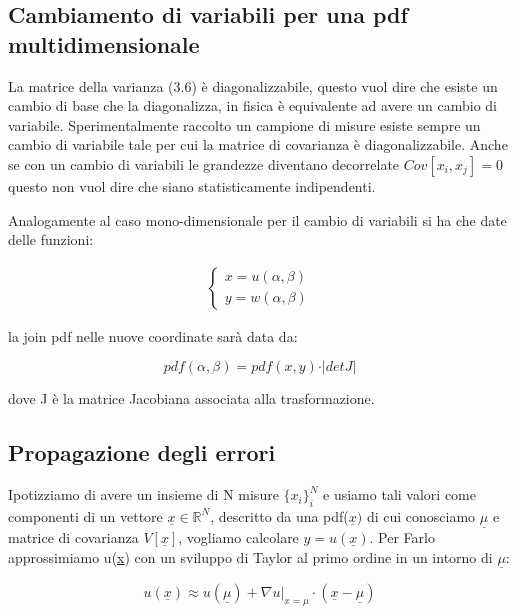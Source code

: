 \subsection{Cambiamento di variabili per una pdf \\ multidimensionale}

La matrice della varianza (3.6) \`{e} diagonalizzabile, questo vuol dire che esiste un cambio di base che la diagonalizza, in fisica \`{e} equivalente ad avere un cambio di variabile. Sperimentalmente raccolto un campione di misure esiste sempre un cambio di variabile tale per cui la matrice di covarianza \`{e} diagonalizzabile. Anche se con un cambio di variabili le grandezze diventano decorrelate $Cov[x_i,x_j] = 0$ questo non vuol dire che siano statisticamente indipendenti.

Analogamente al caso mono-dimensionale per il cambio di variabili si ha che date delle funzioni:

\begin{align*}
	\begin{cases}
		x = u(\alpha,\beta)\\
		y = w(\alpha, \beta)
	\end{cases}
\end{align*}

la join pdf nelle nuove coordinate sar\`{a} data da:

\begin{equation}
	pdf(\alpha, \beta) = pdf(x,y) \cdot \vert detJ\vert
\end{equation}

dove J \`{e} la matrice Jacobiana associata alla trasformazione.
\subsection{Propagazione degli errori}

Ipotizziamo di avere un insieme di N misure $\{x_i\}_i^N$ e usiamo tali valori come componenti di un vettore $\underline{x} \in \mathbb{R}^N$, descritto da una pdf($\underline{x})$ di cui conosciamo $\underline{\mu}$ e matrice di covarianza $V[\underline{x}]$, vogliamo calcolare $y = u(\underline{x})$. Per Farlo approssimiamo u(\underline{x}) con un sviluppo di Taylor al primo ordine in un intorno di $\underline{\mu}$:

\begin{equation*}
	u(\underline{x}) \approx u(\underline{\mu})+ \nabla u\big \vert_{x = \mu}\cdot (\underline{x} - \underline{\mu})
\end{equation*}

